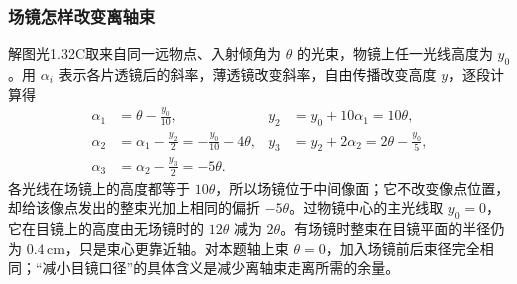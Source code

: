 \documentclass[UTF8,fontset=fandol,a4paper,11pt]{ctexart}
\begin{document}
\subsubsection*{场镜怎样改变离轴束}
解图光1.32C取来自同一远物点、入射倾角为 $\theta$ 的光束，物镜上任一光线高度为 $y_0$。用 $\alpha_i$ 表示各片透镜后的斜率，薄透镜改变斜率，自由传播改变高度 $y$，逐段计算得
\[
\begin{aligned}
\alpha_1&=\theta-\frac{y_0}{10},&
y_2&=y_0+10\alpha_1=10\theta,\\
\alpha_2&=\alpha_1-\frac{y_2}{2}
      =-\frac{y_0}{10}-4\theta,&
y_3&=y_2+2\alpha_2=2\theta-\frac{y_0}{5},\\
\alpha_3&=\alpha_2-\frac{y_3}{2}=-5\theta.&
\end{aligned}
\]
各光线在场镜上的高度都等于 $10\theta$，所以场镜位于中间像面；它不改变像点位置，却给该像点发出的整束光加上相同的偏折 $-5\theta$。过物镜中心的主光线取 $y_0=0$，它在目镜上的高度由无场镜时的 $12\theta$ 减为 $2\theta$。有场镜时整束在目镜平面的半径仍为 $0.4\,\mathrm{cm}$，只是束心更靠近轴。对本题轴上束 $\theta=0$，加入场镜前后束径完全相同；“减小目镜口径”的具体含义是减少离轴束走离所需的余量。
\end{document}
